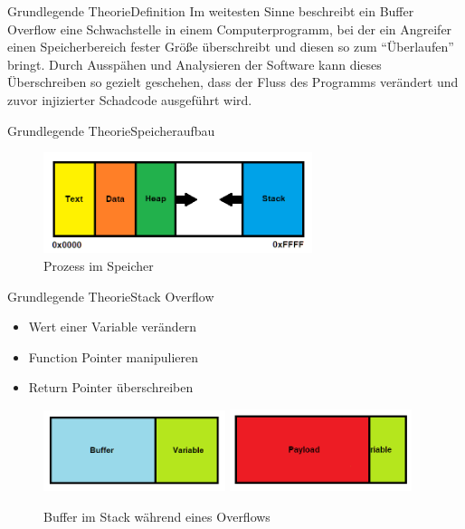\pagebreak
\begin{frame}{Grundlegende Theorie}{Definition}
    Im weitesten Sinne beschreibt ein Buffer Overflow eine Schwachstelle in einem Computerprogramm,
    bei der ein Angreifer einen Speicherbereich fester Größe überschreibt und diesen so zum “Überlaufen” bringt.
    Durch Ausspähen und Analysieren der Software kann dieses Überschreiben so gezielt geschehen, dass der Fluss des
    Programms verändert und zuvor injizierter Schadcode ausgeführt wird.    
\end{frame}


\begin{frame}{Grundlegende Theorie}{Speicheraufbau}
    \begin{figure}[h]
        \centering
        \includegraphics[width=0.7\textwidth,height=0.75\textheight,keepaspectratio]{images/process.png}
        \caption{Prozess im Speicher}
    \end{figure}
\end{frame}

\begin{frame}{Grundlegende Theorie}{Stack Overflow}
    \begin{itemize}
        \setlength{\itemindent}{19em}
        \item Wert einer Variable verändern
        \item Function Pointer manipulieren
        \item Return Pointer überschreiben        
    \end{itemize}
    \begin{figure}[h]
        \includegraphics[width=0.475\textwidth]{images/buffer1.png}
        \hfill
        \includegraphics[width=0.475\textwidth]{images/buffer2.png}
        \caption{Buffer im Stack während eines Overflows}
    \end{figure}
\end{frame}



